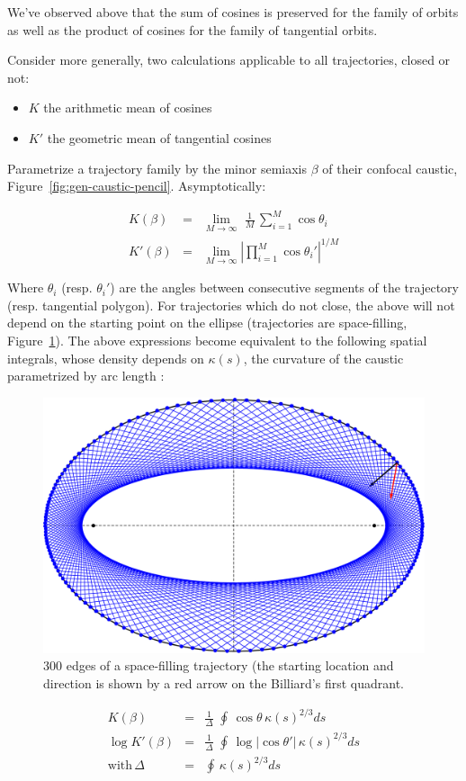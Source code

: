 We've observed above that the sum of cosines is preserved for the family of orbits as well as the product of cosines for the family of tangential orbits.

Consider more generally, two calculations applicable to all trajectories, closed or not:

\begin{itemize}
    \item $K$ the arithmetic mean of cosines
    \item $K'$ the geometric mean of tangential cosines
\end{itemize}

Parametrize a trajectory family by the minor semiaxis $\beta$ of their confocal caustic, Figure~\ref{fig:gen-caustic-pencil}. Asymptotically:

\begin{eqnarray}
K(\beta)&=&\lim_{M\to\infty}\,\,\frac{1}{M}\,  \sum_{i=1}^{M}{\cos\theta_i}\\
K'(\beta)&=&\lim_{M\to\infty}|\prod_{i=1}^{M}{\cos\theta_i'}|^{1/M}
\end{eqnarray}

Where $\theta_i$ (resp. $\theta_i'$) are the angles between consecutive segments of the trajectory (resp. tangential polygon). For trajectories which do not close, the above will not depend on the starting point on the ellipse (trajectories are space-filling, Figure~\ref{fig:space-filling}). The above expressions become equivalent to the following spatial integrals, whose density depends on $\kappa(s)$, the curvature of the caustic parametrized by arc length \cite{sergei17_curvature}:

\begin{figure}
    \centering
\includegraphics[width=.5\textwidth]{pics/0210_space_filling.pdf}
    \caption{300 edges of a  space-filling trajectory (the starting location and direction is shown by a red arrow on the Billiard's first quadrant.}
    \label{fig:space-filling}
\end{figure}

\begin{eqnarray}
K(\beta)&=&\frac{1}{\Delta}\,\,\oint\,\cos\theta\,\kappa(s)^{2/3}ds\\
\log K'(\beta)&=&\frac{ 1}{\Delta}\,\,\oint \,\log|\cos\theta'|\,\kappa(s)^{2/3}ds\\
\mbox{with}\,\Delta&=&\oint\,\kappa(s)^{2/3}ds
\end{eqnarray}

